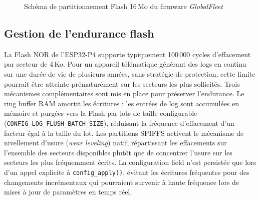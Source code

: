 \begin{figure}[H]
\centering
{}
\caption{Schéma de partitionnement Flash 16\,Mo du firmware \textit{GlobalFleet}}
\label{fig:partitions}
\end{figure}

\subsection{Gestion de l'endurance flash}
\label{subsec:storage_endur}

La Flash NOR de l'ESP32-P4 supporte typiquement 100\,000 cycles
d'effacement par secteur de 4\,Ko. Pour un appareil télématique
générant des logs en continu sur une durée de vie de plusieurs années,
sans stratégie de protection, cette limite pourrait être atteinte
prématurément sur les secteurs les plus sollicités. Trois mécanismes
complémentaires sont mis en place pour préserver l'endurance. Le ring
buffer RAM amortit les écritures : les entrées de log sont accumulées
en mémoire et purgées vers la Flash par lots de taille configurable
(\texttt{CONFIG\_LOG\_FLUSH\_BATCH\_SIZE}), réduisant la fréquence
d'effacement d'un facteur égal à la taille du lot. Les partitions
SPIFFS activent le mécanisme de nivellement d'usure
(\textit{wear leveling}) natif, répartissant les effacements sur
l'ensemble des secteurs disponibles plutôt que de concentrer l'usure
sur les secteurs les plus fréquemment écrits. La configuration field
n'est persistée que lors d'un appel explicite à \texttt{config\_apply()},
évitant les écritures fréquentes pour des changements incrémentaux
qui pourraient survenir à haute fréquence lors de mises à jour de
paramètres en temps réel.

